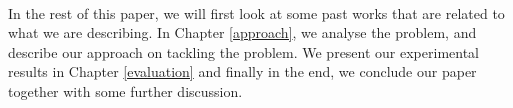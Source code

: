\paragraph{}
In the rest of this paper, we will first look at some past works that are related to what we are describing. In Chapter \ref{approach}, we analyse the problem, and describe our approach on tackling the problem. We present our experimental results in Chapter \ref{evaluation} and finally in the end, we conclude our paper together with some further discussion.